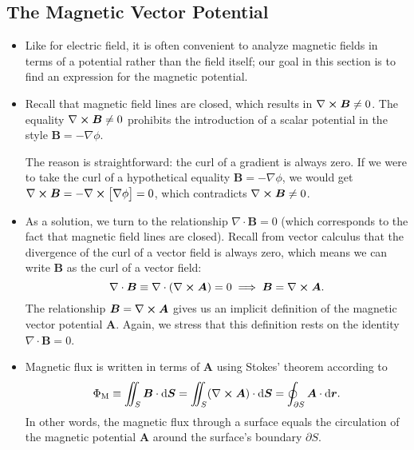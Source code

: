 \documentclass[11pt, a4paper]{article}
\newcommand{\diff}{\mathop{}\!\mathrm{d}} %
\renewcommand{\vec}[1]{\bm{#1}} %
\renewcommand{\r}{\vec{r}}
\newcommand{\B}{\vec{B}} %
\newcommand{\A}{\vec{A}} %
\renewcommand{\div}{\nabla \cdot}
\renewcommand{\curl}{\nabla \cross}
\renewcommand{\grad}{\nabla}
\begin{document}
\subsection{The Magnetic Vector Potential}
\begin{itemize}
	\item Like for electric field, it is often convenient to analyze magnetic fields in terms of a potential rather than the field itself; our goal in this section is to find an expression for the magnetic potential.
	
    \item Recall that magnetic field lines are closed, which results in $ \curl \B \neq 0 $. The equality $ \curl \B \neq 0 $ prohibits the introduction of a scalar potential in the style $ \B = - \grad \phi $.

    The reason is straightforward: the curl of a gradient is always zero. If we were to take the curl of a hypothetical equality $ \B = - \grad \phi $, we would get $ \curl \B = - \curl \big[ \grad \phi \big] = 0 $, which contradicts $ \curl \B \neq 0 $. 
	
	\item As a solution, we turn to the relationship $ \div \B = 0 $ (which corresponds to the fact that magnetic field lines are closed). Recall from vector calculus that the divergence of the curl of a vector field is always zero, which means we can write $ \B $ as the curl of a vector field:
	\begin{equation*}
		\div \B \equiv \div \left(\curl \A\right) = 0 \implies \B = \curl \A. 
	\end{equation*}
    The relationship $ \B = \curl \A $ gives us an implicit definition of the magnetic vector potential $ \A $. Again, we stress that this definition rests on the identity $ \div \B = 0 $. 
	
	\item Magnetic flux is written in terms of $ \A $ using Stokes' theorem according to
	\begin{equation*}
		\Phi_{\text{M}} \equiv \iint_{S}\B \cdot \diff \vec{S} = \iint_{S} (\curl \A) \cdot \diff \vec{S} = \oint_{\partial S} \A \cdot \diff \r.
	\end{equation*}
	In other words, the magnetic flux through a surface equals the circulation of the magnetic potential $ \A $ around the surface's boundary $ \partial S $.

\end{itemize}
\end{document}
